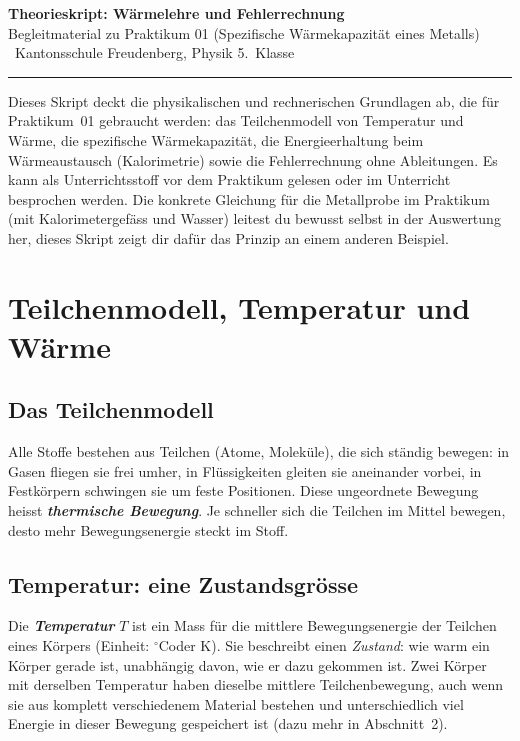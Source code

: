 \documentclass[11pt,a4paper]{article}
\newcommand{\Temp}{T}
\newcommand{\celsius}{\ensuremath{^{\circ}\mathrm{C}}}
\newcommand{\kelvin}{K}
\begin{document}
\thispagestyle{empty}

\begin{center}
  {\color{kfrblue}\Large\bfseries Theorieskript: Wärmelehre und Fehlerrechnung}\\[2pt]
  {\normalsize Begleitmaterial zu Praktikum 01 (Spezifische Wärmekapazität eines Metalls) \textbar\ Kantonsschule Freudenberg, Physik 5.\ Klasse}
\end{center}

\vspace{10pt}
\hrule
\vspace{10pt}

\noindent
Dieses Skript deckt die physikalischen und rechnerischen Grundlagen ab, die für Praktikum~01 gebraucht werden: das Teilchenmodell von Temperatur und Wärme, die spezifische Wärmekapazität, die Energieerhaltung beim Wärmeaustausch (Kalorimetrie) sowie die Fehlerrechnung ohne Ableitungen. Es kann als Unterrichtsstoff vor dem Praktikum gelesen oder im Unterricht besprochen werden. Die konkrete Gleichung für die Metallprobe im Praktikum (mit Kalorimetergefäss und Wasser) leitest du bewusst selbst in der Auswertung her, dieses Skript zeigt dir dafür das Prinzip an einem anderen Beispiel.

\section{Teilchenmodell, Temperatur und Wärme}

\subsection{Das Teilchenmodell}
Alle Stoffe bestehen aus Teilchen (Atome, Moleküle), die sich ständig bewegen: in Gasen fliegen sie frei umher, in Flüssigkeiten gleiten sie aneinander vorbei, in Festkörpern schwingen sie um feste Positionen. Diese ungeordnete Bewegung heisst \textbf{\emph{thermische Bewegung}}. Je schneller sich die Teilchen im Mittel bewegen, desto mehr Bewegungsenergie steckt im Stoff.

\subsection{Temperatur: eine Zustandsgrösse}
Die \textbf{\emph{Temperatur}} $\Temp$ ist ein Mass für die mittlere Bewegungsenergie der Teilchen eines Körpers (Einheit: \celsius oder \kelvin). Sie beschreibt einen \emph{Zustand}: wie warm ein Körper gerade ist, unabhängig davon, wie er dazu gekommen ist. Zwei Körper mit derselben Temperatur haben dieselbe mittlere Teilchenbewegung, auch wenn sie aus komplett verschiedenem Material bestehen und unterschiedlich viel Energie in dieser Bewegung gespeichert ist (dazu mehr in Abschnitt~2).
\end{document}
